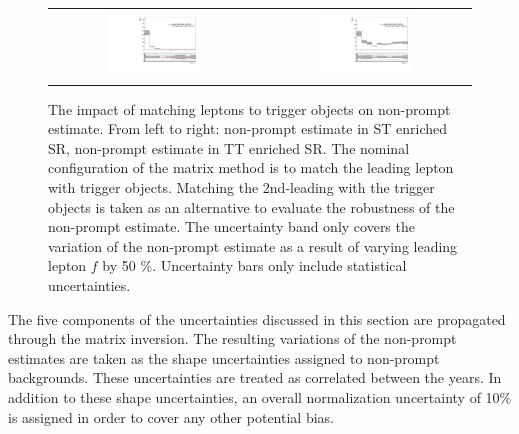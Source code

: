 \begin{figure}[tbh!]
 \begin{center}
 \begin{tabular}{cc}
 \includegraphics[width=0.47\textwidth]{figures/Part3/Systematics/BDT_ST_MM}&
 \includegraphics[width=0.47\textwidth]{figures/Part3/Systematics/BDT_TT_MM} \\
 \end{tabular}
 \caption{The impact of matching leptons to trigger objects on non-prompt estimate. From left to right: non-prompt estimate in ST enriched SR, non-prompt estimate in TT enriched SR. The nominal configuration of the matrix method is to match the leading lepton with trigger objects. Matching the 2nd-leading with the trigger objects is taken as an alternative to evaluate the robustness of the non-prompt estimate. The uncertainty band only covers the variation of the non-prompt estimate as a result of varying leading lepton $f$ by 50 $\%$. Uncertainty bars only include statistical uncertainties.}
 \label{fig:MM_trigger}
 \end{center}
\end{figure}

The five components of the uncertainties discussed in this section are propagated through the matrix inversion. The resulting variations of the non-prompt estimates are taken as the shape uncertainties assigned to non-prompt backgrounds. These uncertainties are treated as correlated between the years. In addition to these shape uncertainties, an overall normalization uncertainty of 10$\%$ is assigned in order to cover any other potential bias.


